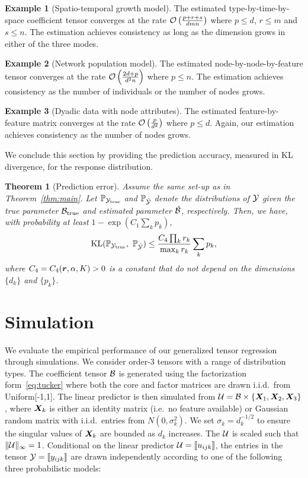 \documentclass[12pt]{article}
\theoremstyle{plain}
\newtheorem{thm}{Theorem}[section]
\theoremstyle{definition}
\newtheorem{example}{Example}
\begin{document}
\begin{example}[Spatio-temporal growth model] The estimated type-by-time-by-space coefficient tensor converges at the rate $\mathcal{O}\left({p+r+s\over dmn}\right)$ where $p\leq d$, $r\leq m$ and $s\leq n$. The estimation achieves consistency as long as the dimension grows in either of the three modes.
\end{example}

\begin{example} [Network population model] The estimated node-by-node-by-feature tensor converges at the rate $\mathcal{O}\left({2d+p\over d^2n}\right)$ where $p\leq n$. The estimation achieves consistency as the number of individuals or the number of nodes grows. 
\end{example}

\begin{example} [Dyadic data with node attributes] The estimated feature-by-feature matrix converges at the rate $\mathcal{O}\left({p\over d^2}\right)$ where $p\leq d$. Again, our estimation achieves consistency as the number of nodes grows. 
\end{example}

We conclude this section by providing the prediction accuracy, measured in KL divergence, for the response distribution.   

\begin{thm}[Prediction error]\label{thm:KL}
Assume the same set-up as in Theorem~\ref{thm:main}. Let $\mathbb{P}_{\mathcal{Y}_{\text{true}}}$ and $\mathbb{P}_{\hat {\mathcal{Y}}}$ denote the distributions of $\mathcal{Y}$ given the true parameter $\mathcal{B}_{\text{true}}$ and estimated parameter $\hat {\mathcal{B}}$, respectively. Then, we have, with probability at least $1-\exp(C_1\sum_k p_k)$,
\[
\text{KL}(\mathbb{P}_{\tY_{\text{true}}},\ \mathbb{P}_{\hat \tY})\leq \frac{ C_{4}\prod_kr_k}{\max_k r_k} \sum_k p_k,
\]
where $C_4=C_4(\bm{r},\alpha, K)>0$ is a constant that do not depend on the dimensions $\{d_k\}$ and $\{p_k\}$.
\end{thm}

\section{Simulation}\label{sec:simulation}
We evaluate the empirical performance of our generalized tensor regression through simulations. We consider order-3 tensors with a range of distribution types. The coefficient tensor $\mathcal{B}$ is generated using the factorization form~\eqref{eq:tucker} where both the core and factor matrices are drawn i.i.d.\ from Uniform[-1,1]. The linear predictor is then simulated from $\mathcal{U}=\mathcal{B}\times\{\bm X_1,\bm X_2,\bm X_3\}$, where $\bm X_k$ is either an identity matrix (i.e.\ no feature available) or Gaussian random matrix with i.i.d.\ entries from $N(0,\sigma_k^2)$. We set $\sigma_k=d_k^{-1/2}$ to ensure the singular values of $\bm X_k$ are bounded as $d_k$ increases. The $\mathcal{U}$ is scaled such that $\lVert\mathcal{U}\rVert_\infty=1$. Conditional on the linear predictor $\mathcal{U}=\llbracket u_{ijk} \rrbracket$, the entries in the tensor $\mathcal{Y}=\llbracket y_{ijk} \rrbracket$ are drawn independently according to one of the following three probabilistic models:
\end{document}
